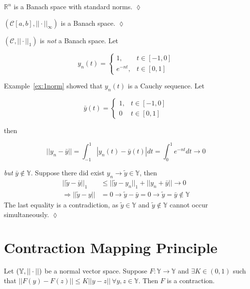 \begin{example}
$\mathbb{R}^n$ is a Banach space with standard norms.
$\lozenge$
\end{example}

\begin{example}
$(\mathcal{C}[a,b],||\cdot||_\infty)$ is a Banach space.
$\lozenge$
\end{example}

\begin{example}
$(\mathcal{C},||\cdot||_1)$ is \textit{not} a Banach space.
Let

\begin{equation*}
y_n(t) = \begin{cases} 1, & t\in[-1,0] \\ e^{-nt}, & t\in[0,1] \end{cases}
\end{equation*}

Example~\ref{ex:1norm} showed that $y_n(t)$ is a Cauchy sequence.
Let

\begin{equation*}
\bar{y}(t) = \begin{cases} 1, & t\in[-1,0] \\ 0 & t\in[0,1] \end{cases}
\end{equation*}

then

\begin{equation*}
||y_n-\bar{y}|| = \int_{-1}^1|y_n(t)-\bar{y}(t)|dt = \int_0^1e^{-nt}dt\to 0
\end{equation*}

\textit{but} $\bar{y}\notin\mathbb{Y}$.
Suppose there did exist $y_n\to\tilde{y}\in\mathbb{Y}$, then
\begin{align*}
||\tilde{y}-\bar{y}||_1 &\leq ||\tilde{y}-y_n||_1+||y_n+\bar{y}||\to 0 \\
\Rightarrow ||\tilde{y}-y|| &= 0 \to \tilde{y}-\bar{y}=0 \to \tilde{y}=\bar{y}\notin\mathbb{Y}
\end{align*}
The last equality is a contradiction, as $\tilde{y}\in\mathbb{Y}$ and $\tilde{y}\notin\mathbb{Y}$ cannot occur simultaneously.
$\lozenge$
\end{example}

\section{Contraction Mapping Principle}
\begin{definition}
Let $(\mathbb{Y},||\cdot||)$ be a normal vector space.
Suppose $F:\mathbb{Y}\to\mathbb{Y}$ and $\exists K\in(0,1)$ such that $||F(y)-F(z)||\leq K||y-z||~\forall y,z\in\mathbb{Y}$.
Then $F$ is a contraction.
\end{definition}

